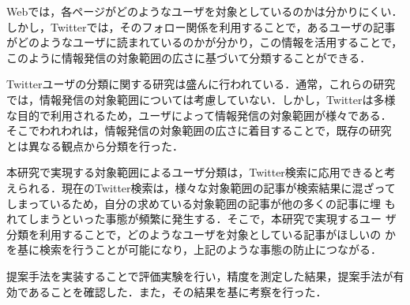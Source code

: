 \begin{jabstract}
Webでは，各ページがどのようなユーザを対象としているのかは分かりにくい．
 しかし，Twitterでは，そのフォロー関係を利用することで，あるユーザの記事
 がどのようなユーザに読まれているのかが分かり，この情報を活用することで，
 このように情報発信の対象範囲の広さに基づいて分類することができる．

Twitterユーザの分類に関する研究は盛んに行われている．通常，これらの研究
 では，情報発信の対象範囲については考慮していない．しかし，Twitterは多様
 な目的で利用されるため，ユーザによって情報発信の対象範囲が様々である．
 そこでわれわれは，情報発信の対象範囲の広さに着目することで，既存の研究
 とは異なる観点から分類を行った．

本研究で実現する対象範囲によるユーザ分類は，Twitter検索に応用できると考
 えられる．現在のTwitter検索は，様々な対象範囲の記事が検索結果に混ざって
 しまっているため，自分の求めている対象範囲の記事が他の多くの記事に埋
 もれてしまうといった事態が頻繁に発生する．そこで，本研究で実現するユー
 ザ分類を利用することで，どのようなユーザを対象としている記事がほしいの
 かを基に検索を行うことが可能になり，上記のような事態の防止につながる．

提案手法を実装することで評価実験を行い，精度を測定した結果，提案手法が有
 効であることを確認した．また，その結果を基に考察を行った．

\end{jabstract}
